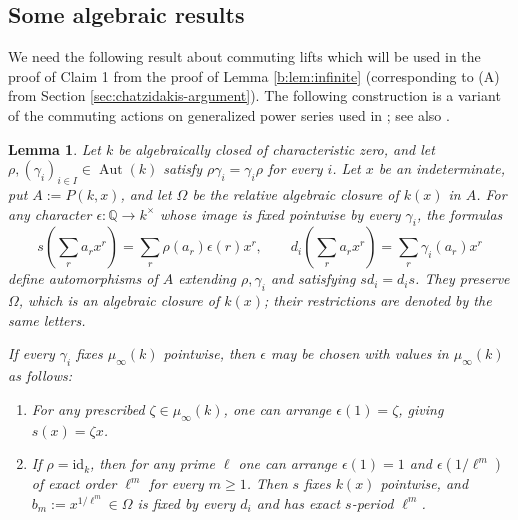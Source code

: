 \documentclass[10pt,a4paper]{amsart}
\renewcommand{\ge}{\geqslant}
\newtheorem{lemma}[theorem]{Lemma}
\theoremstyle{definition}
\newcommand{\Q}{\mathbb Q}
\DeclareMathOperator{\Aut}{Aut}
\begin{document}
\subsection{Some algebraic results}


We need the following result about commuting lifts which will be used in the proof of Claim 1 from the proof of Lemma \ref{b:lem:infinite} (corresponding to (A) from Section
\ref{sec:chatzidakis-argument}). The following construction is a variant of the commuting
actions on generalized power series used in
\cite[Theorem~7]{BHAlgClosure}; see also
\cite[Section~2.1]{BCGeometric}.
\begin{lemma}\label{a:lem:hahn}
Let $k$ be algebraically closed of characteristic zero,
and let $\rho,(\gamma_i)_{i\in I}\in\Aut(k)$ satisfy
$\rho\gamma_i=\gamma_i\rho$ for every $i$.
Let $x$ be an indeterminate, put $A:=P(k,x)$, and let
$\Omega$ be the relative algebraic closure of $k(x)$ in $A$.
For any character $\epsilon:\Q\to k^\times$ whose image
is fixed pointwise by every $\gamma_i$, the formulas
\[
s\!\left(\sum_r a_rx^r\right)
   =\sum_r\rho(a_r)\epsilon(r)x^r,
\qquad
d_i\!\left(\sum_r a_rx^r\right)
   =\sum_r\gamma_i(a_r)x^r
\]
define automorphisms of $A$ extending $\rho,\gamma_i$
and satisfying $sd_i=d_is$.
They preserve $\Omega$, which is an algebraic closure
of $k(x)$; their restrictions are denoted by the same letters.

If every $\gamma_i$ fixes $\mu_\infty(k)$ pointwise,
then $\epsilon$ may be chosen with values in $\mu_\infty(k)$
as follows:
\begin{enumerate}[label=\textup{(\roman*)}]
\item For any prescribed $\zeta\in\mu_\infty(k)$,
one can arrange $\epsilon(1)=\zeta$, giving $s(x)=\zeta x$.
\item If $\rho=\mathrm{id}_k$, then for any prime $\ell$
one can arrange $\epsilon(1)=1$ and
$\epsilon(1/\ell^m)$ of exact order $\ell^m$ for every $m\ge1$.
Then $s$ fixes $k(x)$ pointwise, and
$b_m:=x^{1/\ell^m}\in\Omega$ is fixed by every $d_i$
and has exact $s$-period $\ell^m$.
\end{enumerate}
\end{lemma}
\end{document}

